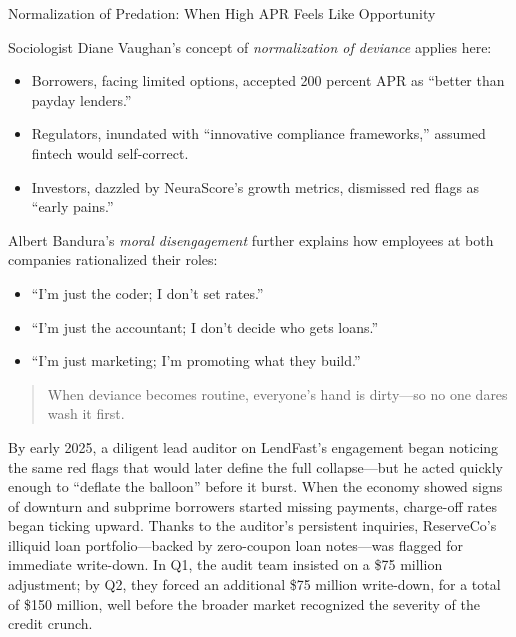 \medskip

\begin{PsychologySidebar}{Normalization of Predation: When High APR Feels Like Opportunity}

Sociologist Diane Vaughan’s concept of \emph{normalization of deviance} applies here:
\begin{itemize}
  \item  Borrowers, facing limited options, accepted 200 percent APR as “better than payday lenders.”
  \item  Regulators, inundated with “innovative compliance frameworks,” assumed fintech would self-correct.
  \item  Investors, dazzled by NeuraScore’s growth metrics, dismissed red flags as “early pains.”
\end{itemize}

\medskip

Albert Bandura’s \emph{moral disengagement} further explains how employees at both companies rationalized their roles:
\begin{itemize}
  \item  “I’m just the coder; I don’t set rates.”
  \item  “I’m just the accountant; I don’t decide who gets loans.”
  \item  “I’m just marketing; I’m promoting what they build.”
\end{itemize}

\begin{quote}
When deviance becomes routine, everyone’s hand is dirty—so no one dares wash it first.
\end{quote}

\end{PsychologySidebar}

By early 2025, a diligent lead auditor on LendFast’s engagement began noticing the same red flags that would later define the full collapse—but he acted quickly enough to “deflate the balloon” before it burst. When the economy showed signs of downturn and subprime borrowers started missing payments, charge-off rates began ticking upward. Thanks to the auditor’s persistent inquiries, ReserveCo’s illiquid loan portfolio—backed by zero-coupon loan notes—was flagged for immediate write-down. In Q1, the audit team insisted on a \$75 million adjustment; by Q2, they forced an additional \$75 million write-down, for a total of \$150 million, well before the broader market recognized the severity of the credit crunch.

